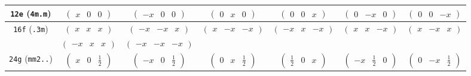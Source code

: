 \documentclass[fleqn,9pt,landscape]{jsarticle}
\begin{document}
\begin{center}
\begin{longtable}{ccccccc}
{\tt 12e} ({\tt 4m.m}) & $ \begin{pmatrix} x & 0 & 0 \end{pmatrix} $ & $ \begin{pmatrix} - x & 0 & 0 \end{pmatrix} $ & $ \begin{pmatrix} 0 & x & 0 \end{pmatrix} $ & $ \begin{pmatrix} 0 & 0 & x \end{pmatrix} $ & $ \begin{pmatrix} 0 & - x & 0 \end{pmatrix} $ & $ \begin{pmatrix} 0 & 0 & - x \end{pmatrix} $ \\ \hline
{\tt 16f} ({\tt .3m}) & $ \begin{pmatrix} x & x & x \end{pmatrix} $ & $ \begin{pmatrix} - x & - x & x \end{pmatrix} $ & $ \begin{pmatrix} x & - x & - x \end{pmatrix} $ & $ \begin{pmatrix} - x & x & - x \end{pmatrix} $ & $ \begin{pmatrix} x & x & - x \end{pmatrix} $ & $ \begin{pmatrix} x & - x & x \end{pmatrix} $ \\
& $ \begin{pmatrix} - x & x & x \end{pmatrix} $ & $ \begin{pmatrix} - x & - x & - x \end{pmatrix} $ & $  $ & $  $ & $  $ & $  $ \\ \hline
{\tt 24g} ({\tt mm2..}) & $ \begin{pmatrix} x & 0 & \frac{1}{2} \end{pmatrix} $ & $ \begin{pmatrix} - x & 0 & \frac{1}{2} \end{pmatrix} $ & $ \begin{pmatrix} 0 & x & \frac{1}{2} \end{pmatrix} $ & $ \begin{pmatrix} \frac{1}{2} & 0 & x \end{pmatrix} $ & $ \begin{pmatrix} - x & \frac{1}{2} & 0 \end{pmatrix} $ & $ \begin{pmatrix} 0 & - x & \frac{1}{2} \end{pmatrix} $ \\

\end{longtable}
\end{center}
\end{document}
